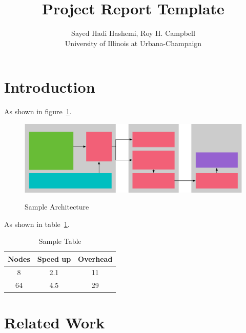 \documentclass[twocolumn]{article}
\begin{document}
\title{Project Report Template}
\author{Sayed Hadi Hashemi, Roy H. Campbell \\ \small University of Illinois at Urbana-Champaign}
\date{}
\maketitle
\section{Introduction}
  \blindtext[3]

  As shown in figure~\ref{fig:sample}.

  \begin{figure}[tbh]
    \centering
    \includegraphics[width=\columnwidth]{sample-figure.pdf}
    \label{fig:sample}
    \caption{Sample Architecture}
  \end{figure}
  
  \blindtext[3]

  As shown in table~\ref{table:sample}.
  
  \begin{table}
  \centering
  \begin{tabular}{@{}ccc@{}}
  \toprule
  Nodes & Speed up & Overhead\\
  \midrule
  8 & 2.1 & 11\\
  64 & 4.5 & 29 \\
  \bottomrule
  \end{tabular}
  \label{table:sample}  
  \caption{Sample Table}
  \end{table}


\section{Related Work}
  \blindtext
  \cite{Hashemi2018}
  \blindtext[3]
  \blindtext[3]

{\footnotesize 

}
\end{document}
